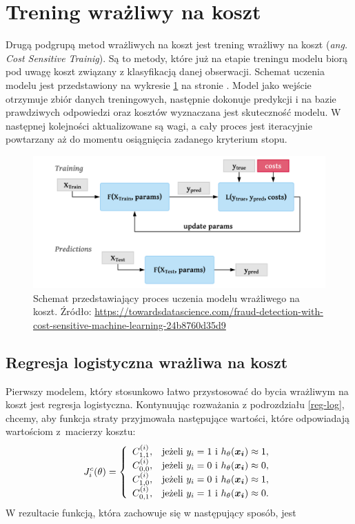 \documentclass[inzynierska]{pwr_wmat_praca_dyplomowa}
\theoremstyle{plain}
\numberwithin{theorem}{chapter}
\theoremstyle{definition}
\numberwithin{theorem}{chapter}
\begin{document}
\section{Trening wrażliwy na koszt}
Drugą podgrupą metod wrażliwych na koszt jest trening wrażliwy na koszt (\textit{ang. Cost Sensitive Trainig}). Są to metody, które już na etapie treningu modelu biorą pod uwagę koszt związany z klasyfikacją danej obserwacji. Schemat uczenia modelu jest przedstawiony na wykresie \ref{cst} na stronie \pageref{cst}. Model jako wejście otrzymuje zbiór danych treningowych, następnie dokonuje predykcji i na bazie prawdziwych odpowiedzi oraz kosztów wyznaczana jest skuteczność modelu. W następnej kolejności aktualizowane są wagi, a cały proces jest iteracyjnie powtarzany aż do momentu osiągnięcia zadanego kryterium stopu.
\begin{figure}[h]
	\includegraphics[width=\linewidth]{images/cost_sensitive_training.png}
	\caption{Schemat przedstawiający proces uczenia modelu wrażliwego na koszt. Źródło: \url{https://towardsdatascience.com/fraud-detection-with-cost-sensitive-machine-learning-24b8760d35d9}}
	\label{cst}
\end{figure}	

\subsection{Regresja logistyczna wrażliwa na koszt}
Pierwszy modelem, który stosunkowo łatwo przystosować do bycia wrażliwym na koszt jest regresja logistyczna. Kontynuując rozważania z podrozdziału \ref{reg-log}, chcemy, aby funkcja straty przyjmowała następujące wartości, które odpowiadają wartościom z~macierzy kosztu:
$$
J^c_i(\theta)=\left\{
\begin{array}{rl}
C^{(i)}_{1,1}, &\mbox{jeżeli $y_i = 1$ i $h_{\theta}(\boldsymbol{x_i}) \approx 1$}, \\
C^{(i)}_{0,0}, &\mbox{jeżeli $y_i = 0$ i $h_{\theta}(\boldsymbol{x_i}) \approx 0$}, \\
C^{(i)}_{1,0}, &\mbox{jeżeli $y_i = 0$ i $h_{\theta}(\boldsymbol{x_i}) \approx 1$}, \\
C^{(i)}_{0,1}, &\mbox{jeżeli $y_i = 1$ i $h_{\theta}(\boldsymbol{x_i}) \approx 0$}.
\end{array}
\right.
$$
W rezultacie funkcją, która zachowuje się w następujący sposób, jest
\end{document}

